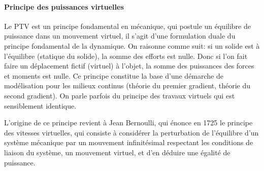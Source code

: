 \medskip
\paragraph{Principe des puissances virtuelles}
Le PTV est un principe fondamental en mécanique, qui postule un équilibre de puissance dans un
mouvement virtuel, il s'agit d'une formulation duale du principe fondamental de la dynamique.
On raisonne comme suit: si un solide est à l'équilibre (statique du solide), la somme des efforts
est nulle. Donc si l'on fait faire un déplacement fictif (virtuel) à l'objet, la somme des puissances
des forces et moments est nulle.
Ce principe constitue la base d'une démarche de modélisation pour les milieux continus (théorie du
premier gradient, théorie du second gradient).
On parle parfois du principe des travaux virtuels qui est sensiblement identique.



\medskip



\begin{histoire}%
L'origine de ce principe revient à Jean Bernoulli,
qui énonce en 1725 le principe des vitesses
virtuelles, qui consiste à considérer la perturbation de l'équilibre d'un système mécanique
par un mouvement infinitésimal respectant les conditions de liaison du système, un mouvement
virtuel, et d'en déduire une égalité de puissance.

\sbox{\MaBoiteAvecPhotos}{\setlength{\tabcolsep}{0pt}\scriptsize%
\begin{tabular}{ccc}%
\texttt{[image: Bernoulli-Jean]}&
\texttt{[image: dAlembert2]}&
\texttt{[image: Lagrange3]}\\
J. Bernoulli  &D'Alembert&Lagrange%
\end{tabular}}
\medskip
{}
\end{histoire}

